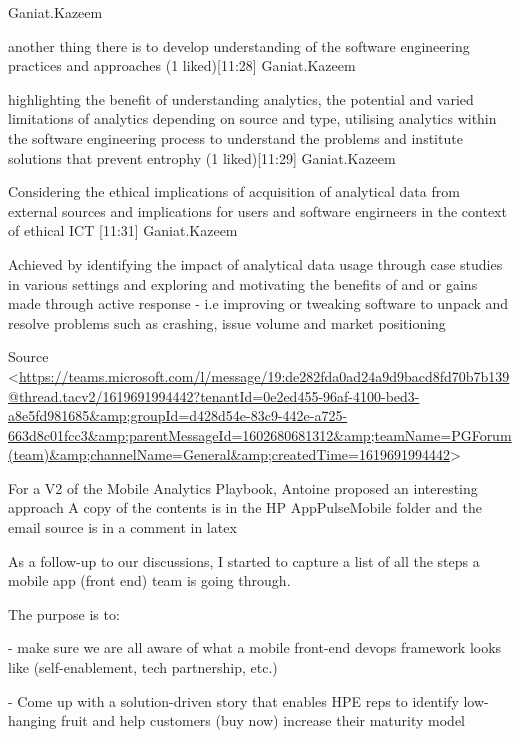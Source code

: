 \begin{mdframed}[style=MyFrame]
[11:26] Ganiat.Kazeem
    
another thing there is to develop understanding of the software engineering practices and approaches
(1 liked)​[11:28] Ganiat.Kazeem
    
highlighting the benefit of understanding analytics,  the potential and varied limitations of analytics depending on source and type, utilising analytics within the software engineering process to understand the problems and institute solutions that prevent entrophy
(1 liked)​[11:29] Ganiat.Kazeem
    
Considering the ethical implications of acquisition of analytical data from external sources and implications for users and software engirneers in the context of ethical ICT
​[11:31] Ganiat.Kazeem
    
Achieved by identifying the impact of analytical data usage through case studies in various settings and exploring and motivating the benefits of and or gains made through active response - i.e improving or tweaking software to unpack and resolve problems such as crashing, issue volume and market positioning

Source <\url{https://teams.microsoft.com/l/message/19:de282fda0ad24a9d9bacd8fd70b7b139@thread.tacv2/1619691994442?tenantId=0e2ed455-96af-4100-bed3-a8e5fd981685&amp;groupId=d428d54e-83c9-442e-a725-663d8c01fcc3&amp;parentMessageId=1602680681312&amp;teamName=PGForum (team)&amp;channelName=General&amp;createdTime=1619691994442}>
\end{mdframed}

For a V2 of the Mobile Analytics Playbook, Antoine proposed an interesting approach A copy of the contents is in the HP AppPulseMobile folder and the email source is in a comment in latex %

As a follow-up to our discussions, I started to capture a list of all the steps a mobile app (front end) team is going through.

The purpose is to:

-          make sure we are all aware of what a mobile front-end devops framework looks like (self-enablement, tech partnership, etc.)

-          Come up with a solution-driven story that enables HPE reps to identify low-hanging fruit and help customers (buy now) increase their maturity model

